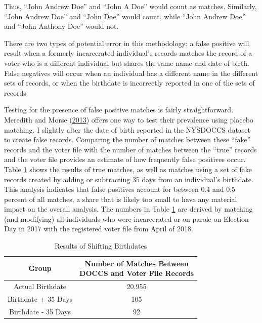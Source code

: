 \documentclass[12pt,]{article}
\begin{document}
Thus, ``John Andrew Doe'' and ``John A Doe'' would count as matches. Similarly, ``John Andrew Doe'' and ``John Doe'' would count, while ``John Andrew Doe'' and ``John Anthony Doe'' would not.

There are two types of potential error in this methodology: a false positive will result when a formerly incarcerated individual's records matches the record of a voter who is a different individual but shares the same name and date of birth. False negatives will occur when an individual has a different name in the different sets of records, or when the birthdate is incorrectly reported in one of the sets of records

Testing for the presence of false positive matches is fairly straightforward. Meredith and Morse (\protect\hyperlink{ref-Meredith2013}{2013}) offers one way to test their prevalence using placebo matching. I slightly alter the date of birth reported in the NYSDOCCS dataset to create false records. Comparing the number of matches between these ``fake'' records and the voter file with the number of matches between the ``true'' records and the voter file provides an estimate of how frequently false positives occur. Table \ref{tab:change-dobs} shows the results of true matches, as well as matches using a set of fake records created by adding or subtracting 35 days from an individual's birthdate. This analysis indicates that false positives account for between 0.4 and 0.5 percent of all matches, a share that is likely too small to have any material impact on the overall analysis. The numbers in Table \ref{tab:change-dobs} are derived by matching (and modifying) all individuals who were incarcerated or on parole on Election Day in 2017 with the registered voter file from April of 2018.

\begin{table}[H]

\caption{\label{tab:shift-dobs-chunk}\label{tab:change-dobs} Results of Shifting Birthdates}
\centering
\begin{tabular}[t]{cc}
\toprule
Group & \makecell[l]{Number of Matches Between\\DOCCS and Voter File Records}\\
\midrule
Actual Birthdate & 20,955\\
Birthdate + 35 Days & 105\\
Birthdate - 35 Days & 92\\
\bottomrule
\end{tabular}
\end{table}
\end{document}
